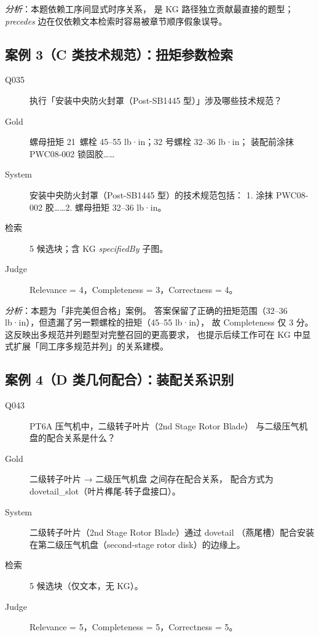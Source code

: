 \textit{分析}：本题依赖工序间显式时序关系，
是 KG 路径独立贡献最直接的题型；
\textit{precedes} 边在仅依赖文本检索时容易被章节顺序假象误导。

\subsection{案例 3（C 类技术规范）：扭矩参数检索}

\begin{description}
  \item[\textnormal{Q035}] 执行「安装中央防火封罩（Post-SB1445 型）」涉及哪些技术规范？
  \item[\textnormal{Gold}] 螺母扭矩 21~螺栓 45--55 lb·in；32 号螺栓 32--36 lb·in；
        装配前涂抹 PWC08-002 锁固胶……
  \item[\textnormal{System}] 安装中央防火封罩（Post-SB1445 型）的技术规范包括：
        1. 涂抹 PWC08-002 胶……2. 螺母扭矩 32--36 lb·in。
  \item[\textnormal{检索}] 5 候选块；含 KG \textit{specifiedBy} 子图。
  \item[\textnormal{Judge}] Relevance = 4，Completeness = 3，Correctness = 4。
\end{description}

\textit{分析}：本题为「非完美但合格」案例。
答案保留了正确的扭矩范围（32--36 lb·in），但遗漏了另一颗螺栓的扭矩（45--55 lb·in），
故 Completeness 仅 3 分。这反映出多规范并列题型对完整召回的更高要求，
也提示后续工作可在 KG 中显式扩展「同工序多规范并列」的关系建模。

\subsection{案例 4（D 类几何配合）：装配关系识别}

\begin{description}
  \item[\textnormal{Q043}] PT6A 压气机中，二级转子叶片（2nd Stage Rotor Blade）
        与二级压气机盘的配合关系是什么？
  \item[\textnormal{Gold}] 二级转子叶片 → 二级压气机盘 之间存在配合关系，
        配合方式为 dovetail\_slot（叶片榫尾-转子盘接口）。
  \item[\textnormal{System}] 二级转子叶片（2nd Stage Rotor Blade）通过 dovetail
        （燕尾槽）配合安装在第二级压气机盘（second-stage rotor disk）的边缘上。
  \item[\textnormal{检索}] 5 候选块（仅文本，无 KG）。
  \item[\textnormal{Judge}] Relevance = 5，Completeness = 5，Correctness = 5。
\end{description}

